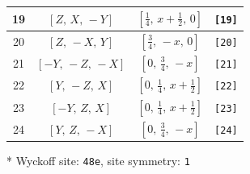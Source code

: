 \documentclass[fleqn,8pt]{jsarticle}
\begin{document}
\begin{longtable}{cccc}
19 & $\left[ Z,\, X,\, - Y \right]$ & $\left[ \frac{1}{4},\, x + \frac{1}{2},\, 0 \right]$ & {\tt [19]} \\ \hline
20 & $\left[ Z,\, - X,\, Y \right]$ & $\left[ \frac{3}{4},\, - x,\, 0 \right]$ & {\tt [20]} \\ \hline
21 & $\left[ - Y,\, - Z,\, - X \right]$ & $\left[ 0,\, \frac{3}{4},\, - x \right]$ & {\tt [21]} \\ \hline
22 & $\left[ Y,\, - Z,\, X \right]$ & $\left[ 0,\, \frac{1}{4},\, x + \frac{1}{2} \right]$ & {\tt [22]} \\ \hline
23 & $\left[ - Y,\, Z,\, X \right]$ & $\left[ 0,\, \frac{1}{4},\, x + \frac{1}{2} \right]$ & {\tt [23]} \\ \hline
24 & $\left[ Y,\, Z,\, - X \right]$ & $\left[ 0,\, \frac{3}{4},\, - x \right]$ & {\tt [24]} \\
\end{longtable}
* Wyckoff site: {\tt 48e}, site symmetry: {\tt 1}
\renewcommand{\arraystretch}{1.2}
\end{document}

